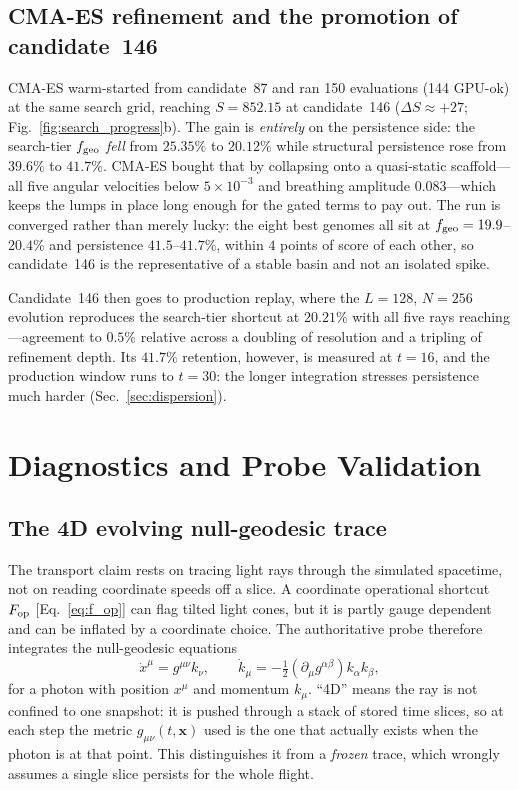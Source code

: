 \documentclass[twocolumn,floatfix,aps,prd,nofootinbib]{revtex4-2}
\begin{document}
\subsection{CMA-ES refinement and the promotion of candidate~146}

CMA-ES warm-started from candidate~87 and ran 150 evaluations (144 GPU-ok) at
the same search grid, reaching $S=852.15$ at candidate~146
($\Delta S\approx+27$; Fig.~\ref{fig:search_progress}b). The gain is
\emph{entirely} on the persistence side: the search-tier $f_{\rm geo}$
\emph{fell} from $25.35\%$ to $20.12\%$ while structural persistence rose from
$39.6\%$ to $41.7\%$. CMA-ES bought that by collapsing onto a quasi-static
scaffold---all five angular velocities below $5\times10^{-3}$ and breathing
amplitude $0.083$---which keeps the lumps in place long enough for the gated
terms to pay out. The run is converged rather than merely lucky: the eight
best genomes all sit at $f_{\rm geo}=19.9$--$20.4\%$ and persistence
$41.5$--$41.7\%$, within $4$ points of score of each other, so candidate~146
is the representative of a stable basin and not an isolated spike.

Candidate~146 then goes to production replay, where the $L=128$, $N=256$
evolution reproduces the search-tier shortcut at $20.21\%$ with all five rays
reaching---agreement to $0.5\%$ relative across a doubling of resolution and a
tripling of refinement depth. Its $41.7\%$ retention, however, is measured at
$t=16$, and the production window runs to $t=30$: the longer integration
stresses persistence much harder (Sec.~\ref{sec:dispersion}).

\section{Diagnostics and Probe Validation}
\label{sec:probes}

\subsection{The 4D evolving null-geodesic trace}

The transport claim rests on tracing light rays through the simulated
spacetime, not on reading coordinate speeds off a slice. A coordinate
operational shortcut $F_{\rm op}$ [Eq.~\eqref{eq:f_op}] can flag tilted light
cones, but it is partly gauge dependent and can be inflated by a coordinate
choice. The authoritative probe therefore integrates the null-geodesic
equations
\begin{equation}
\dot x^\mu=g^{\mu\nu}k_\nu, \qquad \dot k_\mu=-\tfrac12(\partial_\mu g^{\alpha\beta}) k_\alpha k_\beta,
\label{eq:geodesic_eqs}
\end{equation}
for a photon with position $x^\mu$ and momentum $k_\mu$. ``4D'' means the ray
is not confined to one snapshot: it is pushed through a stack of stored time
slices, so at each step the metric $g_{\mu\nu}(t,\mathbf{x})$ used is the one
that actually exists when the photon is at that point. This distinguishes it
from a \emph{frozen} trace, which wrongly assumes a single slice persists for
the whole flight.
\end{document}
